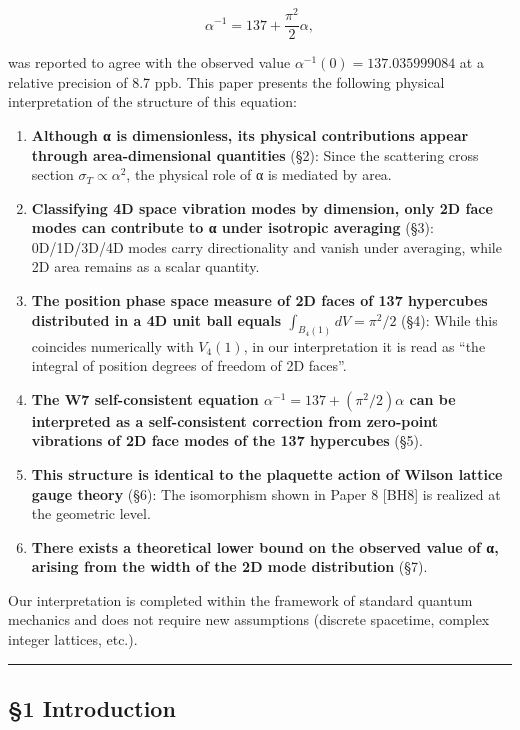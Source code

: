 \documentclass[
  11pt]{article}
\providecommand{\tightlist}{%
  \setlength{\itemsep}{0pt}\setlength{\parskip}{0pt}}
\begin{document}
\[\alpha^{-1} = 137 + \frac{\pi^2}{2}\alpha,\]

was reported to agree with the observed value
\(\alpha^{-1}(0) = 137.035999084\) at a relative precision of 8.7 ppb.
This paper presents the following physical interpretation of the
structure of this equation:

\begin{enumerate}
\def\labelenumi{\arabic{enumi}.}
\tightlist
\item
  \textbf{Although α is dimensionless, its physical contributions appear
  through area-dimensional quantities} (§2): Since the scattering cross
  section \(\sigma_T \propto \alpha^2\), the physical role of α is
  mediated by area.
\item
  \textbf{Classifying 4D space vibration modes by dimension, only 2D
  face modes can contribute to α under isotropic averaging} (§3):
  0D/1D/3D/4D modes carry directionality and vanish under averaging,
  while 2D area remains as a scalar quantity.
\item
  \textbf{The position phase space measure of 2D faces of 137 hypercubes
  distributed in a 4D unit ball equals \(\int_{B_4(1)} dV = \pi^2/2\)}
  (§4): While this coincides numerically with \(V_4(1)\), in our
  interpretation it is read as ``the integral of position degrees of
  freedom of 2D faces''.
\item
  \textbf{The W7 self-consistent equation
  \(\alpha^{-1} = 137 + (\pi^2/2)\alpha\) can be interpreted as a
  self-consistent correction from zero-point vibrations of 2D face modes
  of the 137 hypercubes} (§5).
\item
  \textbf{This structure is identical to the plaquette action of Wilson
  lattice gauge theory} (§6): The isomorphism shown in Paper 8 {[}BH8{]}
  is realized at the geometric level.
\item
  \textbf{There exists a theoretical lower bound on the observed value
  of α, arising from the width of the 2D mode distribution} (§7).
\end{enumerate}

Our interpretation is completed within the framework of standard quantum
mechanics and does not require new assumptions (discrete spacetime,
complex integer lattices, etc.).

\begin{center}\rule{0.5\linewidth}{0.5pt}\end{center}

\subsection{§1 Introduction}\label{introduction}
\end{document}
